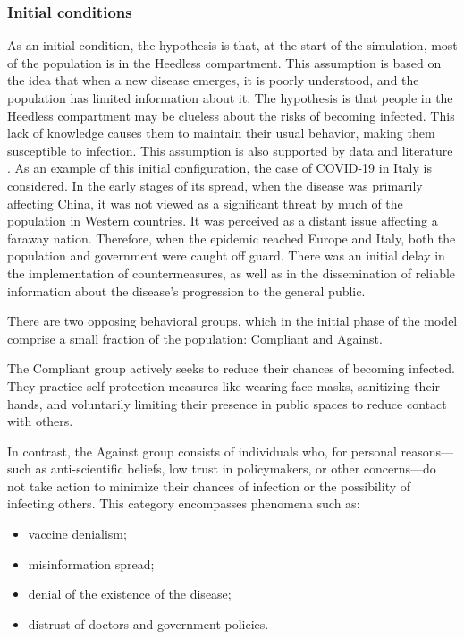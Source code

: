 \subsubsection{Initial conditions}
As an initial condition, the hypothesis is that, at the start of the simulation, most of the population is in the Heedless compartment. This assumption is based on the idea that when a new disease emerges, it is poorly understood, and the population has limited information about it. The hypothesis is that people in the Heedless compartment may be clueless about the risks of becoming infected. This lack of knowledge causes them to maintain their usual behavior, making them susceptible to infection. This assumption is also supported by data and literature \cite{Usher_2020}. As an example of this initial configuration, the case of COVID-19 in Italy is considered. In the early stages of its spread, when the disease was primarily affecting China, it was not viewed as a significant threat by much of the population in Western countries. It was perceived as a distant issue affecting a faraway nation. Therefore, when the epidemic reached Europe and Italy, both the population and government were caught off guard. There was an initial delay in the implementation of countermeasures, as well as in the dissemination of reliable information about the disease's progression to the general public.

There are two opposing behavioral groups, which in the initial phase of the model comprise a small fraction of the population: Compliant and Against.

The Compliant group actively seeks to reduce their chances of becoming infected. They practice self-protection measures like wearing face masks, sanitizing their hands, and voluntarily limiting their presence in public spaces to reduce contact with others.

In contrast, the Against group consists of individuals who, for personal reasons—such as anti-scientific beliefs, low trust in policymakers, or other concerns—do not take action to minimize their chances of infection or the possibility of infecting others. This category encompasses phenomena such as: 
\begin{itemize} 
	\item vaccine denialism; 
	\item misinformation spread; 
	\item denial of the existence of the disease; 
	\item distrust of doctors and government policies. 
\end{itemize}

